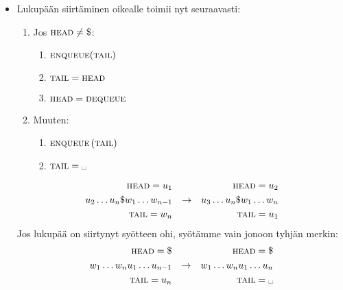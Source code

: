 \documentclass[finnish,11pt,draft]{article}
\newcommand{\spc}{\text{\textvisiblespace}}
\begin{document}
\begin{enumerate}
\begin{itemize}
\item
  Lukupään siirtäminen oikealle toimii nyt seuraavasti:
  \begin{enumerate}[label=\arabic*.]
  \item
    Jos $\textsc{head} \neq \$$:
    \begin{enumerate}[label=\arabic*.]
    \item
      $\textsc{enqueue}(\textsc{tail})$
    \item
      $\textsc{tail} = \textsc{head}$
    \item
      $\textsc{head} = \textsc{dequeue}$
    \end{enumerate}
  \item
    Muuten:
    \begin{enumerate}[label=\arabic*.]
    \item
      $\textsc{enqueue}\left(\textsc{tail}\right)$
    \item
      $\textsc{tail} = \spc$
    \end{enumerate}
  \end{enumerate}
%
  \begin{align*}
    \textsc{head} = u_1 &&&& \textsc{head} = u_2 \\
    u_2 \dots u_n \$ w_1 \dots w_{n-1} && \to && u_3 \dots u_n \$ w_1 \dots w_n \\
    \textsc{tail} = w_n &&&& \textsc{tail} = u_1
  \end{align*}
%
  Jos lukupää on siirtynyt syötteen ohi, syötämme vain jonoon tyhjän merkin:
%
  \begin{align*}
    \textsc{head} = \$ &&&& \textsc{head} = \$ \\
    w_1 \dots w_nu_1 \dots u_{n-1} && \to && w_1 \dots w_nu_1 \dots u_n \\
    \textsc{tail} = u_n &&&& \textsc{tail} = \spc
  \end{align*}


\end{itemize}
\end{enumerate}
\end{document}

